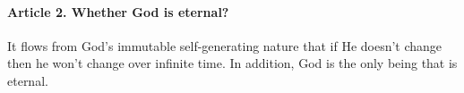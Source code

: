 \documentclass{ucetd}
\begin{document}
\paragraph{Article 2. Whether God is eternal?}
It flows from God's immutable self-generating nature that if He doesn't change then he won't change over infinite time. In addition, God is the only being that is eternal.
\end{document}
